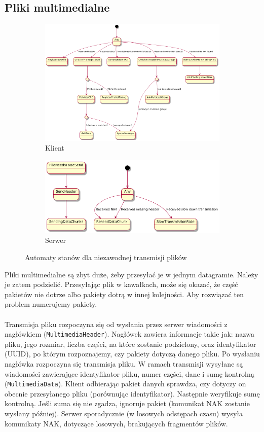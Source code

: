 \documentclass[12pt, a4paper]{article}
\begin{document}
\hypertarget{pliki-multimedialne}{%
\subsection{Pliki multimedialne}\label{pliki-multimedialne}}

\begin{figure}[H]
\centering
  \begin{subfigure}[b]{0.48\linewidth}
    \includegraphics[width=0.7\linewidth]{client_diagram.png}
    \caption{Klient}
  \end{subfigure}
  \begin{subfigure}[b]{0.48\linewidth}
    \includegraphics[width=\linewidth]{server_diagram.png}
    \caption{Serwer}
  \end{subfigure}
\caption{Automaty stanów dla niezawodnej transmisji plików}
\label{fig:state_diagrams}
\end{figure}

Pliki multimedialne są zbyt duże, żeby przesyłać je w jednym datagramie.
Należy je zatem podzielić. Przesyłając plik w kawałkach, może się
okazać, że część pakietów nie dotrze albo pakiety dotrą w innej
kolejności. Aby rozwiązać ten problem numerujemy pakiety.
\\
\\
Transmisja pliku rozpoczyna się od wysłania przez serwer wiadomości z nagłówkiem (\texttt{MultimediaHeader}).
Nagłówek zawiera informacje takie jak: nazwa pliku, jego rozmiar, liczba części, na
które zostanie podzielony, oraz identyfikator (UUID), po którym rozpoznajemy, czy
pakiety dotyczą danego pliku. Po wysłaniu nagłówka rozpoczyna się transmisja pliku. W ramach transmisji wysyłane
są wiadomości zawierające identyfikator pliku, numer części, dane i sumę kontrolną (\texttt{MultimediaData}). Klient odbierając pakiet danych sprawdza, czy dotyczy on obecnie przesyłanego pliku (porównując identyfikator). Następnie weryfikuje sumę kontrolną. Jeśli suma się nie zgadza, ignoruje pakiet (komunikat NAK zostanie wysłany później). Serwer sporadycznie (w losowych odstępach czasu) wysyła komunikaty NAK, dotyczące losowych, brakujących fragmentów plików.
\end{document}
